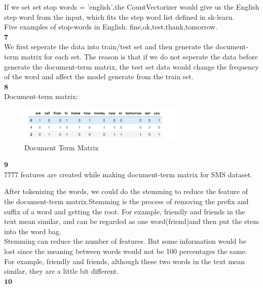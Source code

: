\documentclass[12pt]{article}
\begin{document}
If we set set stop words = 'english',the CountVectorizer would give us the English step word from the input, which fits the step word list defined in sk-learn.\\

Five examples of stop-words in English: fine,ok,test,thank,tomorrow.\\

$\textbf{7}$\\

We first seperate the data into train/test set and then generate the document-term matrix for each set. The reason is that if we do not seperate the data before generate the document-term matrix, the test set data would change the frequency of the word and affect the model generate from the train set.\\

$\textbf{8}$\\

Document-term matrix:\\

\begin{figure}[H] 
\centering 
\includegraphics[width=0.7\textwidth]{documentterm} 
\caption{Document Term Matrix}
\end{figure}

$\textbf{9}$\\

7777 features are created while making document-term matrix for SMS dataset.

After tokenizing the words, we could do the stemming to reduce the feature of the document-term matrix.Stemming is the process of removing the prefix and suffix of a word and getting the root. For example, friendly and friends in the text mean similar, and can be regarded as one word(friend)and then put the stem into the word bag.\\

Stemming can reduce the number of features. But some information would be lost since the meaning between words would not be 100 percentages the same. For example, friendly and friends, although these two words in the text mean similar, they are a little bit different.\\

$\textbf{10}$\\
\end{document}

